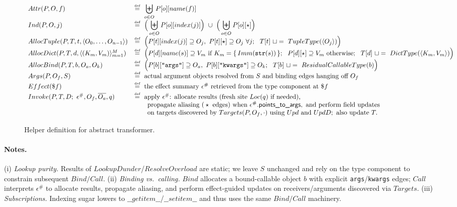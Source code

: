 \begin{figure*}[t]
\centering
\begin{align*}
\begin{array}{ll}
Attr(P,O,f) &\defeq\ \displaystyle\biguplus_{o\in O} P[o][name(f)]
\\[0.2em]
Ind(P,O,j) &\defeq\ \displaystyle\Big(\biguplus_{o\in O} P[o][index(j)]\Big)\ \cup\ \Big(\biguplus_{o\in O} P[o][\star]\Big)
\\[0.2em]
AllocTuple(P,T,t,\langle O_0,\ldots,O_{n-1}\rangle)
  &\defeq\ \Big(P[t][index(j)] \supseteq O_j,\ P[t][\star]\supseteq O_j\ \forall j;\ \ T[t]\ \sqcup=\ TupleType(\langle O_j\rangle)\Big)
\\[0.2em]
AllocDict(P,T,d,\langle (K_m,V_m)\rangle_{m=1}^M)
  &\defeq\ \Big(P[d][name(s)] \supseteq V_m\ \text{if } K_m=\{\,Imm(\texttt{str}(s))\,\};\ \ P[d][\star]\supseteq V_m\ \text{otherwise};\ \ T[d]\ \sqcup=\ DictType(\langle K_m,V_m\rangle)\Big)
\\[0.2em]
AllocBind(P,T,b,O_a,O_k)
  &\defeq\ \Big(P[b][\texttt{"args"}]\supseteq O_a,\ P[b][\texttt{"kwargs"}]\supseteq O_k;\ \ T[b]\ \sqcup=\ ResidualCallableType(b)\Big)
\\[0.2em]
Args(P,O_f,S)
  &\defeq\ \text{actual argument objects resolved from }S\text{ and binding edges hanging off }O_f
\\[0.2em]
Effect(\$f)
  &\defeq\ \text{the effect summary }\epsilon^\#\text{ retrieved from the type component at }\$f
\\[0.2em]
Invoke(P,T,D;\ \epsilon^\#,O_f,\overline{O_a},q)
  &\defeq\ \text{apply }\epsilon^\#\text{: allocate results (fresh site } Loc(q)\text{ if needed),}\\
  &\qquad\text{propagate aliasing (}\star\text{ edges) when }\epsilon^\#.\tptstoargs,\ \text{and perform field updates}\\
  &\qquad\text{on targets discovered by }Targets(P,O_f,\cdot)\text{ using } Upd \text{ and } UpdD; \text{ also update }T.
\end{array}
\end{align*}
\caption{Helper definition for abstract transformer.}
\label{fig:tac-transfers-helpers}
\end{figure*}

\paragraph{Notes.}
(i) \emph{Lookup purity.} Results of \(LookupDunder\)/\(ResolveOverload\) are static; we leave \(S\) unchanged and rely on the type component to constrain subsequent \(Bind/Call\).
(ii) \emph{Binding vs.\ calling.} \(Bind\) allocates a bound-callable object \(b\) with explicit \texttt{args}/\texttt{kwargs} edges; \(Call\) interprets \(\epsilon^\#\) to allocate results, propagate aliasing, and perform effect-guided updates on receivers/arguments discovered via \(Targets\).
(iii) \emph{Subscriptions.} Indexing sugar lowers to \(\_\_getitem\_\_\)/\(\_\_setitem\_\_\) and thus uses the same \(Bind/Call\) machinery.


